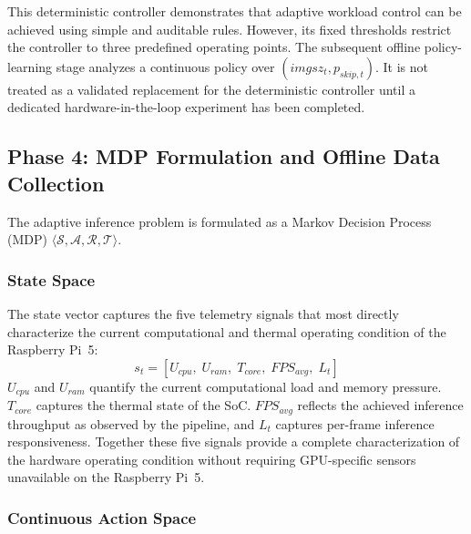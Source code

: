\documentclass{ieeeaccess}
\begin{document}
\begin{highlight}
This deterministic controller demonstrates that adaptive workload control
can be achieved using simple and auditable rules. However, its fixed
thresholds restrict the controller to three predefined operating points.
The subsequent offline policy-learning stage analyzes a continuous policy
over $(imgsz_t,p_{skip,t})$. It is not treated as a validated replacement for
the deterministic controller until a dedicated hardware-in-the-loop experiment
has been completed.
\end{highlight}

\subsection{Phase 4: MDP Formulation and Offline Data Collection}

The adaptive inference problem is formulated as a Markov Decision Process
(MDP) $\langle \mathcal{S}, \mathcal{A}, \mathcal{R}, \mathcal{T} \rangle$.

\subsubsection*{State Space}

The state vector captures the five telemetry signals that most directly
characterize the current computational and thermal operating condition of
the Raspberry Pi~5:
\begin{equation}
s_t = [U_{cpu},\; U_{ram},\; T_{core},\; FPS_{avg},\; L_t]
\end{equation}
$U_{cpu}$ and $U_{ram}$ quantify the current computational load and memory
pressure. $T_{core}$ captures the thermal state of the SoC. $FPS_{avg}$
reflects the achieved inference throughput as observed by the pipeline, and
$L_t$ captures per-frame inference responsiveness. Together these five signals
provide a complete characterization of the hardware operating condition without
requiring GPU-specific sensors unavailable on the Raspberry Pi~5.

\subsubsection*{Continuous Action Space}
\end{document}
